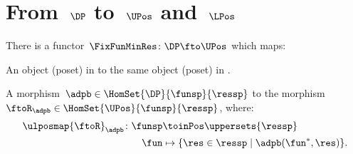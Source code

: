 \section{From~$\DP$ to~$\UPos$ and~$\LPos$}
\begin{lemma}
\label{lem:covfunctor}
There is a functor~$\FixFunMinRes\colon \DP \fto \UPos$ which maps:
\begin{compactenum}
\item An object (poset) in \DP to the same object (poset) in \UPos.
\item A morphism~$\adpb\in \HomSet{\DP}{\funsp}{\ressp}$ to the morphism~$\ftoR_{\adpb}\in \HomSet{\UPos}{\funsp}{\ressp}$, where:
\begin{equation}
\begin{aligned}
\ulposmap{\ftoR}_{\adpb}\colon \funsp &\toinPos \uppersets{\ressp}\\
\fun&\mapsto \{\res \in \ressp\mid \adpb(\fun^*,\res)\}.
\end{aligned}
\end{equation}
\end{compactenum}
\end{lemma}

